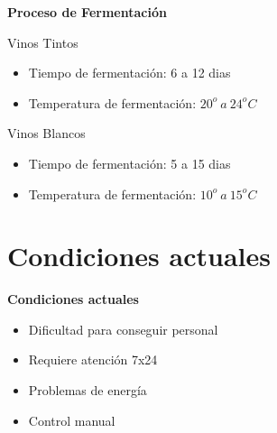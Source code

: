 \documentclass[11pt]{beamer}
\begin{document}
\begin{frame}{\LARGE{\textbf{Proceso de Fermentación}}}
  \vspace{-30px}

  {\fontsize{17pt}{17}\selectfont
      \vspace{15px}
      Vinos Tintos
      \vspace{5px}
      \begin{itemize}
        \item Tiempo de fermentación: 6 a 12 dias
        \vspace{5px}
        \item Temperatura de fermentación: $20^o\ a\ 24^oC$
      \end{itemize}
        \vspace{15px}
      Vinos Blancos
        \vspace{5px}
        \begin{itemize}
          \item Tiempo de fermentación: 5 a 15 dias
          \vspace{5px}
          \item Temperatura de fermentación: $10^o\ a\ 15^oC$
        \end{itemize}
  }
\end{frame}


\section[Problema]{Condiciones actuales}

\begin{frame}{\textbf{\LARGE{Condiciones actuales}}}
  \fontsize{18pt}{18}\selectfont
  \begin{itemize}
    \item { Dificultad para conseguir personal }
        \vspace{20px}
    \item Requiere atención 7x24
        \vspace{20px}
    \item Problemas de energía
        \vspace{20px}
    \item Control manual
  \end{itemize}
\end{frame}
\end{document}
